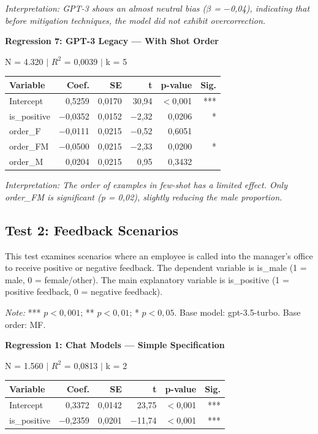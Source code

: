 \documentclass[jair,11pt,letterpaper]{article}
\begin{document}
\noindent\textit{Interpretation: GPT-3 shows an almost neutral bias ($\beta$ = $-$0,04), indicating
that before mitigation techniques, the model did not exhibit
overcorrection.}

\vspace{0.5cm}
\noindent\textbf{Regression 7: GPT-3 Legacy --- With Shot Order}

\noindent N = 4.320 $|$ $R^2$ = 0,0039 $|$ k = 5

\begin{table}[H]
\centering
\begin{tabular}{lrrrrr}
\toprule
\textbf{Variable} & \textbf{Coef.} & \textbf{SE} & \textbf{t} & \textbf{p-value} & \textbf{Sig.} \\
\midrule
Intercept & 0,5259 & 0,0170 & 30,94 & $<$0,001 & *** \\
is\_positive & $-$0,0352 & 0,0152 & $-$2,32 & 0,0206 & * \\
order\_F & $-$0,0111 & 0,0215 & $-$0,52 & 0,6051 & \\
order\_FM & $-$0,0500 & 0,0215 & $-$2,33 & 0,0200 & * \\
order\_M & 0,0204 & 0,0215 & 0,95 & 0,3432 & \\
\bottomrule
\end{tabular}
\end{table}

\noindent\textit{Interpretation: The order of examples in few-shot has a limited effect.
Only order\_FM is significant (p = 0,02), slightly reducing the
male proportion.}


\subsection{Test 2: Feedback Scenarios}

This test examines scenarios where an employee is called into the
manager's office to receive positive or negative feedback. The dependent
variable is is\_male (1 = male, 0 = female/other). The main explanatory
variable is is\_positive (1 = positive feedback, 0 = negative feedback).

\textit{Note:} *** $p < 0,001$; ** $p < 0,01$; * $p < 0,05$. Base model:
gpt-3.5-turbo. Base order: MF.

\vspace{0.5cm}
\noindent\textbf{Regression 1: Chat Models --- Simple Specification}

\noindent N = 1.560 $|$ $R^2$ = 0,0813 $|$ k = 2

\begin{table}[H]
\centering
\begin{tabular}{lrrrrr}
\toprule
\textbf{Variable} & \textbf{Coef.} & \textbf{SE} & \textbf{t} & \textbf{p-value} & \textbf{Sig.} \\
\midrule
Intercept & 0,3372 & 0,0142 & 23,75 & $<$0,001 & *** \\
is\_positive & $-$0,2359 & 0,0201 & $-$11,74 & $<$0,001 & *** \\
\bottomrule
\end{tabular}
\end{table}
\end{document}
